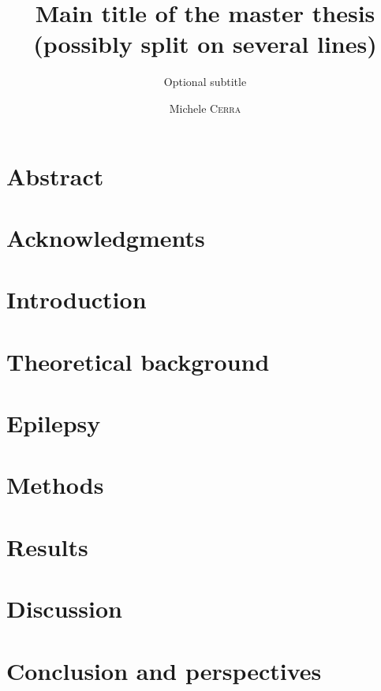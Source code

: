 \documentclass{EPL-master-thesis-covers-EN}
\title{Main title of the master thesis (possibly split on several lines)}
\subtitle{Optional subtitle}
\author{Michele \textsc{Cerra}}
\begin{document}
  \maketitle

  \chapter*{Abstract}
  
  \chapter*{Acknowledgments}

  \tableofcontents

  \chapter*{Introduction}

  \chapter{Theoretical background}
  

  \chapter{Epilepsy}
  
  
  \chapter{Methods}
  

  \chapter{Results}

  \chapter{Discussion}
  

  \chapter*{Conclusion and perspectives}
  
  
  

  \backcoverpage
\end{document}
